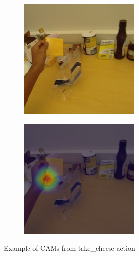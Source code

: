 \documentclass[10pt,twocolumn,hidelinks,letterpaper]{article}
\begin{document}
\begin{figure}[t]
\begin{subfigure}{.35\linewidth}
  \end{subfigure}
  \begin{subfigure}{.35\linewidth}
  	\includegraphics[width=\linewidth]{images/Cams1/S2_take_cheese/rgb0027.png}
  \end{subfigure}
  \begin{subfigure}{.35\linewidth}
  	\includegraphics[width=\linewidth]{images/Cams1/S2_take_cheese/rgb0027_CAM.png}
  \end{subfigure}
  \caption{Example of CAMs from take\_cheese action}
  \label{cams1_1}
\end{figure}
\end{document}
